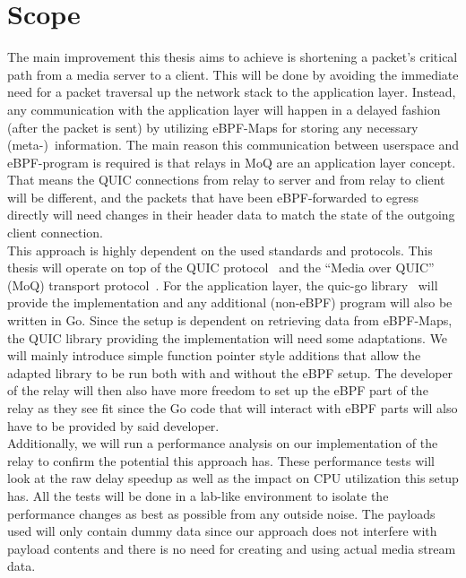 \section{Scope}\label{sec:scope}

The main improvement this thesis aims to achieve is shortening a packet's critical path from a media server to a client.
This will be done by avoiding the immediate need for a packet traversal up the network stack to the application layer.
Instead, any communication with the application layer will happen in a delayed fashion (after the packet is sent) by utilizing 
eBPF-Maps for storing any necessary (meta-)~information.
The main reason this communication between userspace and eBPF-program is required is that relays in MoQ are an application layer concept.
That means the QUIC connections from relay to server and from relay to client will be different, and the packets that have been eBPF-forwarded to egress directly will need changes in their header data to match the state of the outgoing client connection.  
\\
This approach is highly dependent on the used standards and protocols.
This thesis will operate on top of the QUIC protocol~\parencite{rfc-9000} and the ``Media over QUIC'' (MoQ) 
transport protocol~\parencite{draft-moqtransport}.
For the application layer, the quic-go library~\parencite{quic-go-repo} will provide the implementation and 
any additional (non-eBPF) program will also be written in Go.
Since the setup is dependent on retrieving data from eBPF-Maps, the QUIC library providing the implementation 
will need some adaptations.
We will mainly introduce simple function pointer style additions that allow the adapted library to be run 
both with and without the eBPF setup.
The developer of the relay will then also have more freedom to set up the eBPF part of the relay as they see fit
since the Go code that will interact with eBPF parts will also have to be provided by said developer.
\\
Additionally, we will run a performance analysis on our implementation of the relay to confirm the potential this 
approach has.
These performance tests will look at the raw delay speedup as well as the impact on CPU utilization this 
setup has.
All the tests will be done in a lab-like environment to isolate the performance changes as best as possible
from any outside noise.
The payloads used will only contain dummy data since our approach does not interfere with payload contents 
and there is no need for creating and using actual media stream data.
\\
